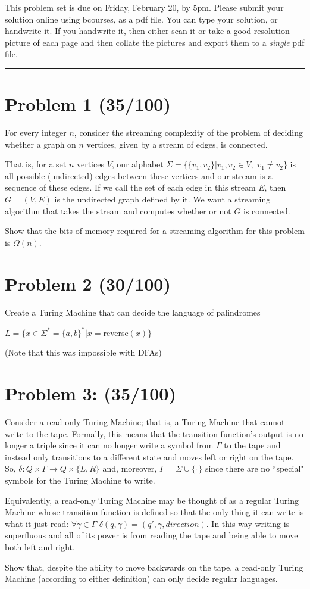 \documentclass[11pt]{article}
\begin{document}
This problem set is due on Friday, February 20, by 5pm. Please submit your solution online using bcourses,
as a pdf file.
You can type your solution, or handwrite it. If you handwrite it, then either
scan it or take a good resolution picture of each page and then collate the pictures
and export them to a {\em single} pdf file.
\bigskip
\hrule



\section*{Problem 1 (35/100)}
For every integer $n$, consider the streaming complexity of the problem of deciding whether a graph on $n$ vertices, given by a stream of edges, is connected. 

That is, for a set $n$ vertices $V$, our alphabet $\Sigma=\{\{v_1,v_2\}| v_1,v_2\in V,$ $v_1\neq v_2\}$ is all possible (undirected) edges between these vertices  and our stream is a sequence of these edges.  If we call the set of each edge in this stream $E$, then $G=(V,E)$ is the undirected graph defined by it.  We want a streaming algorithm that takes the stream and computes whether or not $G$ is connected.

Show that the bits of memory required for a streaming algorithm for this problem is $\Omega(n)$.

\section*{Problem 2 (30/100)}
Create a Turing Machine that can decide the language of palindromes 

$L=\{x\in\Sigma^*=\{a,b\}^*|x= $reverse$(x)\}$ 

\noindent(Note that this was impossible with DFAs)

\section*{Problem 3:  (35/100)}
Consider a read-only Turing Machine; that is, a Turing Machine that cannot write to the tape.  Formally, this means that the transition function's output is no longer a triple since it can no longer write a symbol from $\Gamma$ to the tape and instead only transitions to a different state and moves left or right on the tape.  So, $\delta: Q \times \Gamma \rightarrow Q \times \{L,R\}$ and, moreover, $\Gamma=\Sigma\cup\{\square\}$ since there are no ``special" symbols for the Turing Machine to write.

Equivalently, a read-only Turing Machine may be thought of as a regular Turing Machine whose transition function is defined so that the only thing it can write is what it just read: $\forall\gamma\in\Gamma$ $\delta(q,\gamma)=(q',\gamma,direction)$.  In this way writing is superfluous and all of its power is from reading the tape and being able to move both left and right.

Show that, despite the ability to move backwards on the tape, a read-only Turing Machine (according to either definition) can only decide regular languages.
\end{document}

